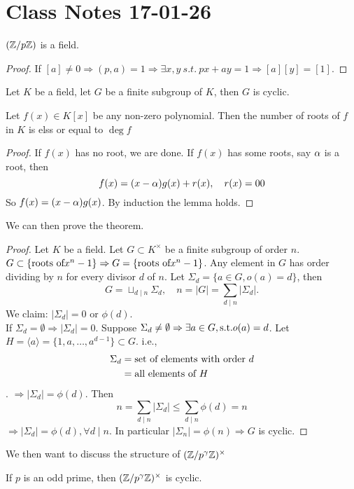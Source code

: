 \documentclass{mynotes}
\begin{document}
\section{Class Notes 17-01-26}
\begin{theorem}
	$(\mathbb{Z}/p\mathbb{Z})$ is a field.
\end{theorem}
\begin{proof}
	If $[a]\ne0 \Rightarrow (p,a) = 1 \Rightarrow \exists x,y\ s.t.\ px+ay = 1\Rightarrow [a][y] = [1]$.
\end{proof}
\begin{theorem}
	Let $K$ be a field, let $G$ be a finite subgroup of $K$, then $G$ is cyclic.
\end{theorem}
\begin{lemma}
	Let $f(x)\in K[x]$ be any non-zero polynomial. Then the number of roots of $f$ in $K$ is elss or equal to $\deg{f}$
\end{lemma}
\begin{proof}
If $f(x)$ has no root, we are done. If $f(x)$ has some roots, say $\alpha$ is a root, then $$f(x) = (x-\alpha)g(x)+ r(x),\quad r(x) = 00$$So $f(x) = (x-\alpha)g(x)$. By induction the lemma holds.
\end{proof}
We can then prove the theorem.
\begin{proof}
	Let $K$ be a field. Let $G\subset K^{\times}$ be a finite subgroup of order $n$. $G\subset \{\hbox{roots of} x^n-1\}\Rightarrow G = \{\hbox{roots of} x^n -1\}$. Any element in $G$ has order dividing by $n$ for every divisor $d$ of $n$. Let $\Sigma_d = \{a\in G, o(a) = d\}$, then $$G=\sqcup_{d\mid n} \Sigma_d, \quad n=|G| = \sum_{d\mid n}|\Sigma_d|.$$
	We claim: $|\Sigma_d| = 0$ or $\phi(d)$.\\
	If $\Sigma_d = \emptyset\Rightarrow |\Sigma_d| = 0$. Suppose $\Sigma_d\ne \emptyset\Rightarrow \exists a\in G, \hbox{s.t.} o(a) = d$. Let $H =\langle a\rangle = \{1,a,\ldots, a^{d-1}\}\subset G.$
	i.e.,\begin{align*}\Sigma_d &=\hbox{set of elements with order } d\\
	&= \hbox{all elements of } H
	\end{align*}.
	$\Rightarrow |\Sigma_d| = \phi(d)$. Then $$n=\sum_{d\mid n}|\Sigma_d|\le \sum_{d\mid n}\phi(d) = n$$
	$\Rightarrow |\Sigma_d| = \phi(d), \forall d\mid n$. In particular $|\Sigma_n| = \phi(n)\Rightarrow G$ is cyclic.
\end{proof}
We then want to discuss the structure of $(\mathbb{Z}/p^{\gamma}\mathbb{Z})^{\times}$
\begin{theorem}
	If $p$ is an odd prime, then $(\mathbb{Z}/p^{\gamma}\mathbb{Z})^{\times}$ is cyclic.
\end{theorem}
\end{document}
